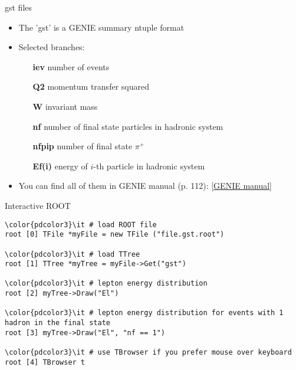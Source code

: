 \begin{slide}{gst files}
\null\vfill

  \begin{itemize}
    \item The 'gst' is a GENIE summary ntuple format
    \item Selected branches:
    
    \begin{itemize}
      \item[\bf iev] number of events
      \item[\bf Q2] momentum transfer squared
      \item[\bf W] invariant mass
      \item[\bf nf] number of final state particles in hadronic system
      \item[\bf nfpip] number of final state $\pi^+$
      \item[\bf Ef(i)] energy of $i$-th particle in hadronic system
    \end{itemize}
    
    \item You can find all of them in GENIE manual (p. 112): \href{http://arxiv.org/pdf/1510.05494v1}{[GENIE manual]}
    
  \end{itemize}

\vfill\null
\end{slide}

\begin{slide}[method=direct]{Interactive ROOT}
\null\vfill

\begin{Verbatim}[commandchars=\\\{\}] 
\color{pdcolor3}\it # load ROOT file
root [0] TFile *myFile = new TFile ("file.gst.root")

\color{pdcolor3}\it # load TTree
root [1] TTree *myTree = myFile->Get("gst")

\color{pdcolor3}\it # lepton energy distribution
root [2] myTree->Draw("El")

\color{pdcolor3}\it # lepton energy distribution for events with 1 hadron in the final state
root [3] myTree->Draw("El", "nf == 1")

\color{pdcolor3}\it # use TBrowser if you prefer mouse over keyboard
root [4] TBrowser t
\end{Verbatim}

\vfill\null
\end{slide}

